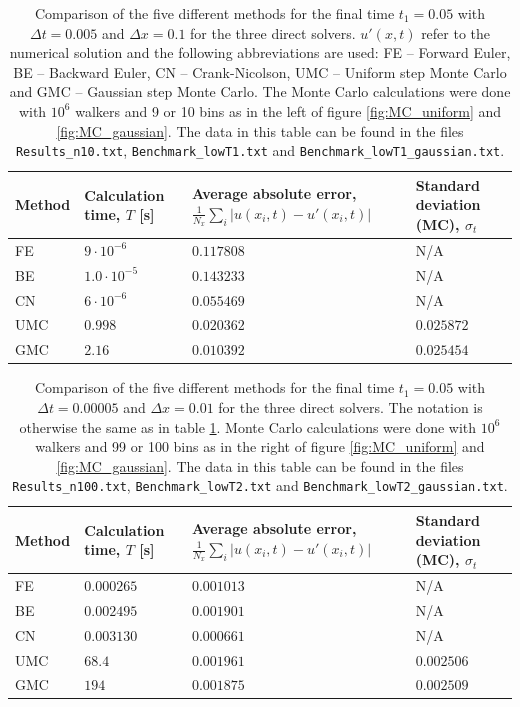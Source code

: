 \documentclass[a4paper, 11pt, notitlepage,english]{article}
\begin{document}
\begin{table}[h!tb]
\begin{center}
\caption{Comparison of the five different methods for the final time $t_1 = 0.05$ with $\Delta t = 0.005$ and $\Delta x=0.1$ for the three direct solvers. $u'(x,t)$ refer to the numerical solution and the following abbreviations are used: FE – Forward Euler, BE – Backward Euler, CN – Crank-Nicolson, UMC – Uniform step Monte Carlo and GMC – Gaussian step Monte Carlo. The Monte Carlo calculations were done with $10^{6}$ walkers and 9 or 10 bins as in the left of figure \ref{fig:MC_uniform} and \ref{fig:MC_gaussian}. The data in this table can be found in the files \texttt{Results\_n10.txt}, \texttt{Benchmark\_lowT1.txt} and \texttt{Benchmark\_lowT1\_gaussian.txt}.} 
\begin{tabular}{p{2cm} p{2cm} p{4cm} p{2.5cm}}
\toprule
Method & Calculation time, $T$ [s] & Average absolute error, $\frac{1}{N_x}\sum_i\lvert u(x_i,t) - u'(x_i,t) \rvert$ & Standard deviation (MC), $\sigma_t$ \\ \midrule
FE & $9\cdot 10^{-6}$ & $0.117808$ & N/A \\
BE & $1.0\cdot 10^{-5}$ & $0.143233$ & N/A \\
CN & $6\cdot 10^{-6}$ & $0.055469$ & N/A \\
UMC & $0.998$ & $0.020362$ & $0.025872$ \\
GMC & $2.16$ & $0.010392$ & $0.025454$ \\
\bottomrule
\end{tabular}
\label{tab:Benchmark1}
\end{center}
\end{table}

\begin{table}[h!tb]
\begin{center}
\caption{Comparison of the five different methods for the final time $t_1 = 0.05$ with $\Delta t = 0.00005$ and $\Delta x=0.01$ for the three direct solvers. The notation is otherwise the same as in table \ref{tab:Benchmark1}. Monte Carlo calculations were done with $10^{6}$ walkers and 99 or 100 bins as in the right of figure \ref{fig:MC_uniform} and \ref{fig:MC_gaussian}. The data in this table can be found in the files \texttt{Results\_n100.txt}, \texttt{Benchmark\_lowT2.txt} and \texttt{Benchmark\_lowT2\_gaussian.txt}.} 
\begin{tabular}{p{2cm} p{2cm} p{4cm} p{2.5cm}}
\toprule
Method & Calculation time, $T$ [s] & Average absolute error, $\frac{1}{N_x}\sum_i\lvert u(x_i,t) - u'(x_i,t) \rvert$ & Standard deviation (MC), $\sigma_t$ \\ \midrule
FE & $0.000265$ & $0.001013$ & N/A \\
BE & $0.002495$ & $0.001901$ & N/A \\
CN & $0.003130$ & $0.000661$ & N/A \\
UMC & $68.4$ & $0.001961$ & $0.002506$ \\
GMC & $194$ & $0.001875$ & $0.002509$ \\
\bottomrule
\end{tabular}
\label{tab:Benchmark2}
\end{center}
\end{table}
\end{document}
